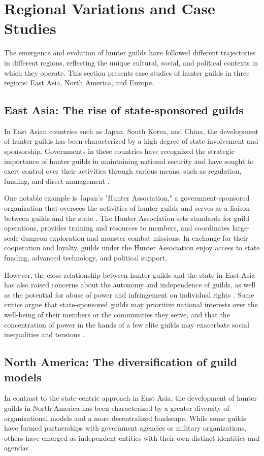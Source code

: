\documentclass[12pt]{article}
\begin{document}
\section{Regional Variations and Case Studies}
The emergence and evolution of hunter guilds have followed different trajectories in different regions, reflecting the unique cultural, social, and political contexts in which they operate. This section presents case studies of hunter guilds in three regions: East Asia, North America, and Europe.

\subsection{East Asia: The rise of state-sponsored guilds}
In East Asian countries such as Japan, South Korea, and China, the development of hunter guilds has been characterized by a high degree of state involvement and sponsorship. Governments in these countries have recognized the strategic importance of hunter guilds in maintaining national security and have sought to exert control over their activities through various means, such as regulation, funding, and direct management \cite{Nakamura2026, Seo2027, Liang2026}.

One notable example is Japan's "Hunter Association," a government-sponsored organization that oversees the activities of hunter guilds and serves as a liaison between guilds and the state \cite{Ishikawa2026}. The Hunter Association sets standards for guild operations, provides training and resources to members, and coordinates large-scale dungeon exploration and monster combat missions. In exchange for their cooperation and loyalty, guilds under the Hunter Association enjoy access to state funding, advanced technology, and political support.

However, the close relationship between hunter guilds and the state in East Asia has also raised concerns about the autonomy and independence of guilds, as well as the potential for abuse of power and infringement on individual rights \cite{Liang2026}. Some critics argue that state-sponsored guilds may prioritize national interests over the well-being of their members or the communities they serve, and that the concentration of power in the hands of a few elite guilds may exacerbate social inequalities and tensions \cite{Nakamura2027}.

\subsection{North America: The diversification of guild models}
In contrast to the state-centric approach in East Asia, the development of hunter guilds in North America has been characterized by a greater diversity of organizational models and a more decentralized landscape. While some guilds have formed partnerships with government agencies or military organizations, others have emerged as independent entities with their own distinct identities and agendas \cite{Branson2027}.
\end{document}
